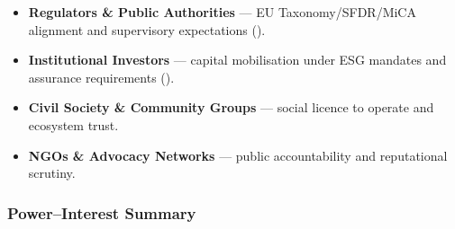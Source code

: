\documentclass[
  english,
  12pt,
  oneside,
  open=any]{scrbook}
\providecommand{\tightlist}{%
  \setlength{\itemsep}{0pt}\setlength{\parskip}{0pt}}\usepackage{longtable,booktabs,array}
\begin{document}
\begin{itemize}
\tightlist
\item
  \textbf{Regulators \& Public Authorities} --- EU Taxonomy/SFDR/MiCA
  alignment and supervisory expectations
  ().\\
\item
  \textbf{Institutional Investors} --- capital mobilisation under ESG
  mandates and assurance requirements
  ().\\
\item
  \textbf{Civil Society \& Community Groups} --- social licence to
  operate and ecosystem trust.\\
\item
  \textbf{NGOs \& Advocacy Networks} --- public accountability and
  reputational scrutiny.
\end{itemize}

\subsubsection{Power--Interest Summary}\label{powerinterest-summary}
\end{document}
